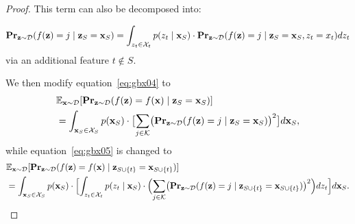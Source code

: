 \documentclass{article}
\newcommand{\z}{\textbf{z}}
\newcommand{\x}{\textbf{x}}
\newcommand{\fml}[1]{{\mathcal{#1}}}
\newcommand{\mbf}[1]{\ensuremath\mathbf{#1}}
\newcommand{\mbb}[1]{\ensuremath\mathbb{#1}}
\begin{document}
\begin{proof}
This term can also be decomposed into:

\begin{equation} \label{eq:con_gbx01}
\mbf{Pr}_{\z\sim \mathcal{D}}(f(\z) = j \mid \z_{S} = \x_{S})
= \int_{z_t \in \fml{X}_t} p(z_t \mid \x_{S}) \cdot \mbf{Pr}_{\z\sim \mathcal{D}}(f(\z) = j \mid \z_{S} = \x_{S}, z_t = x_t) dz_t
\end{equation}
via an additional feature $t \not \in S$.

We then modify equation~\ref{eq:gbx04} to
\begin{equation} \label{eq:con_gbx02}
\begin{aligned}
&\mbb{E}_{\x\sim \mathcal{D}}[\mbf{Pr}_{\z\sim \mathcal{D}}(f(\z) = f(\x) \mid \z_{S} = \x_{S})] \\
&= \int_{\x_{S} \in \fml{X}_{S}} p(\x_{S}) \cdot \bigl[\sum_{j \in \fml{K}} \bigl(\mbf{Pr}_{\z\sim \mathcal{D}}(f(\z) = j \mid \z_{S} = \x_{S})\bigr)^2\bigr] d\x_{S},
\end{aligned}
\end{equation}
%
while equation~\ref{eq:gbx05} is changed to
\begin{equation}\label{eq:con_gbx03} 
\begin{aligned}
&\mbb{E}_{\x\sim \mathcal{D}}[\mbf{Pr}_{\z\sim \mathcal{D}}(f(\z) = f(\x) \mid \z_{S\cup\{t\}} = \x_{S\cup\{t\}})] \\
&= \int_{\x_{S} \in \fml{X}_{S}} p(\x_{S}) \cdot \Bigl[ \int_{z_t \in \fml{X}_t} p(z_t \mid \x_{S})
\cdot \Bigl(\sum_{j\in \fml{K}} \bigl(\mbf{Pr}_{\z\sim \mathcal{D}}(f(\z) = j \mid \z_{S\cup\{t\}} = \x_{S\cup\{t\}})\bigr)^2\Bigr) dz_t \Bigr] d\x_{S}.
\end{aligned}
\end{equation}


\end{proof}
\end{document}

